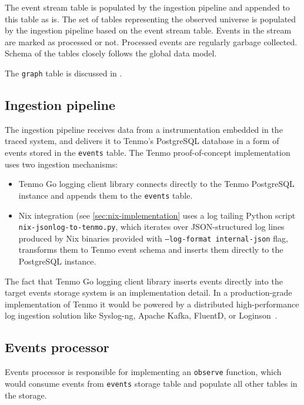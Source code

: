 The event stream table is populated by the ingestion pipeline and appended to this table as is. The set of tables representing the observed universe is populated by the ingestion pipeline based on the event stream table. Events in the stream are marked as processed or not. Processed events are regularly garbage collected. Schema of the tables closely follows the global data model.

The \texttt{graph} table is discussed in .

\subsection{Ingestion pipeline}\label{sec:ingestion-pipeline}

The ingestion pipeline receives data from a instrumentation embedded in the traced system, and delivers it to Tenmo's PostgreSQL database in a form of events stored in the \texttt{events} table. The Tenmo proof-of-concept implementation uses two ingestion mechanisms:
%
\begin{itemize}
    \item Tenmo Go logging client library connects directly to the Tenmo PostgreSQL instance and appends them to the \texttt{events} table.
    \item Nix integration (see \cref{sec:nix-implementation} uses a log tailing Python script \texttt{nix-jsonlog-to-tenmo.py}, which iterates over JSON-structured log lines produced by Nix binaries provided with \texttt{--log-format internal-json} flag, transforms them to Tenmo event schema and inserts them directly to the PostgreSQL instance.
\end{itemize}

The fact that Tenmo Go logging client library inserts events directly into the target events storage system is an implementation detail. In a production-grade implementation of Tenmo it would be powered by a distributed high-performance log ingestion solution like Syslog-ng, Apache Kafka, FluentD, or Loginson~\cite{loginson-vega2017}.

\subsection{Events processor}\label{sec:events-processor}

Events processor is responsible for implementing an \texttt{observe} function, which would consume events from \texttt{events} storage table and populate all other tables in the storage.

